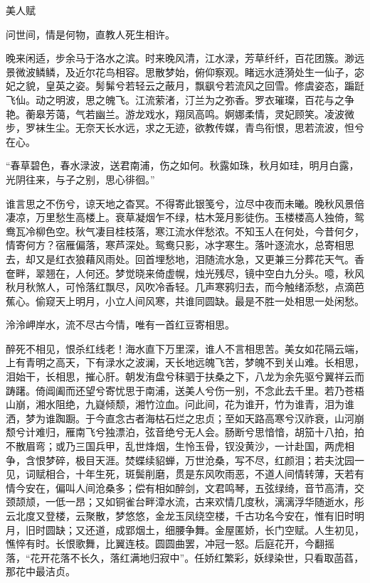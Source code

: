 ﻿
{\kaishu
\begin{center}
\LARGE 美人赋
\end{center}
\par
{\centering 问世间，情是何物，直教人死生相许。

}
\par
晚来闲适，步余马于洛水之滨。时来晚风清，江水渌，芳草纤纤，百花团簇。渺远景微波鳞鳞，及近尔花鸟相容。思散梦始，俯仰察观。睹远水涟漪处生一仙子，宓妃之貌，皇英之姿。髣髴兮若轻云之蔽月，飘飖兮若流风之回雪。修虞姿态，蹁跹飞仙。动之明波，思之魄飞。江流萦渚，汀兰为之弥香。罗衣璀璨，百花与之争艳。蘅皋芳蔼，气若幽兰。游龙戏水，翔凤高鸣。婀娜柔情，灵妃顾笑。凌波微步，罗袜生尘。无奈天长水远，求之无迹，欲教传媒，青鸟衔恨，思若流波，怛兮在心。
\par
“春草碧色，春水渌波，送君南浦，伤之如何。秋露如珠，秋月如珪，明月白露，光阴往来，与子之别，思心徘徊。”
\par
谁言思之不伤兮，谅天地之杳冥。不得寄此银笺兮，泣尽中夜而未曦。晚秋风景倍凄凉，万里愁生高楼上。衰草凝烟乍不绿，枯木笼月影徒伤。玉楼楼高人独倚，鸳鸯瓦冷柳色空。秋气凄目桂枝落，寒江流水伴愁浓。不知玉人在何处，今昔何夕，情寄何方？宿雁偏落，寒芦深处。鸳鸯只影，冰字寒生。落叶逐流水，总寄相思去，却又是红衣狼藉风雨处。回首埋愁地，泪随流水急，又更兼三分葬花天气。香奩畔，翠翘在，人何还。梦觉晓来倚虚幌，烛光残尽，镜中空白九分头。噫，秋风秋月秋煞人，可怜落红飘尽，风吹冷香轻。几声寒鸦归去，而今触绪添愁，点滴芭蕉心。偷窥天上明月，小立人间风寒，共谁同圆缺。最是不胜一处相思一处闲愁。
\par
{\centering 泠泠岬岸水，流不尽古今情，唯有一首红豆寄相思。

}
\par
醉死不相见，恨杀红线老！海水直下万里深，谁人不言相思苦。美女如花隔云端，上有青明之高天，下有渌水之波澜，天长地远魄飞苦，梦魄不到关山难。长相思，泪始干，长相思，摧心肝。朝发洧盘兮秣驷于扶桑之下，八龙为余先驱兮翼祥云而踌躇。倚阊阖而还望兮寄忧思于南浦，送美人兮伤一别，不念此去千里。若乃苍梧山崩，湘水阻绝，九嶷倾颓，湘竹泣血。问此间，花为谁开，竹为谁青，泪为谁洒，梦为谁踟蹰。于今直念古者海枯石烂之忠贞；至如天路高寒兮汉祚衰，山河崩颓兮计难归，雁南飞兮独漂泊，弦音绝兮无人会。肠断兮思愔愔，胡笳十八拍，拍不散眉弯；或乃三国兵甲，乱世烽烟，生怜玉骨，钗没黄沙，一计赴国，两虎相争，含恨梦碎，极目天涯。焚蝶续貂蝉，万世沧桑，写不尽，红颜泪；若夫沈园一见，词赋相合，十年生死，斑鬓削磨，贯是东风吹雨恶，不道人间情转薄，天若有情今安在，偏叫人间沧桑多；偿有相如醉剑，文君鸣琴，五弦绿绮，音节高清，交颈颉颃，一低一昂；又如铜雀台畔漳水流，古来欢情几度秋，漓漓浮华随逝水，彤云北度又登楼，云聚散，梦悠悠，金龙玉凤绕空楼，千古功名今安在，惟有旧时明月，旧时圆缺；又还道，成郢烟土，细腰争舞。金屋匿娇，长门空赋。人生初见，憔悴有时。长恨歌舞，比翼连枝。圆圆曲罢，冲冠一怒。后庭花开，今翻摇落，“花开花落不长久，落红满地归寂中”。任娇红繁彩，妖绿染世，只看取菡萏，那花中最洁贞。

}
% 
